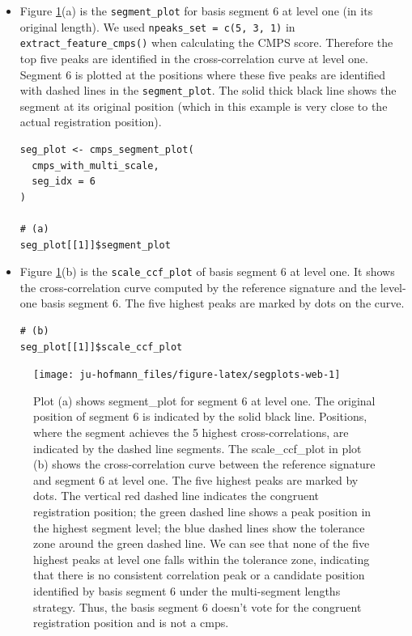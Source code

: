 \begin{itemize}
\item
  Figure \ref{fig:segplots-web}(a) is the \texttt{segment\_plot} for basis segment 6 at level one (in its original length). We used \texttt{npeaks\_set\ =\ c(5,\ 3,\ 1)} in \texttt{extract\_feature\_cmps()} when calculating the CMPS score. Therefore the top five peaks are identified in the cross-correlation curve at level one. Segment 6 is plotted at the positions where these five peaks are identified with dashed lines in the \texttt{segment\_plot}. The solid thick black line shows the segment at its original position (which in this example is very close to the actual registration position).

\begin{verbatim}
seg_plot <- cmps_segment_plot(
  cmps_with_multi_scale,
  seg_idx = 6
)

# (a)
seg_plot[[1]]$segment_plot
\end{verbatim}
\item
  Figure \ref{fig:segplots-web}(b) is the \texttt{scale\_ccf\_plot} of basis segment 6 at level one. It shows the cross-correlation curve computed by the reference signature and the level-one basis segment 6. The five highest peaks are marked by dots on the curve.

\begin{verbatim}
# (b)
seg_plot[[1]]$scale_ccf_plot
\end{verbatim}
\end{itemize}

\begin{figure}

{\centering \texttt{[image: ju-hofmann\_files/figure-latex/segplots-web-1]} 

}

\caption{Plot (a) shows segment\_plot for segment 6 at level one. The original position of segment 6 is indicated by the solid black line. Positions, where the segment achieves the 5 highest cross-correlations, are indicated by the dashed line segments. The scale\_ccf\_plot in plot (b) shows the cross-correlation curve between the reference signature and segment 6 at level one. The five highest peaks are marked by dots. The vertical red dashed line indicates the congruent registration position; the green dashed line shows a peak position in the highest segment level; the blue dashed lines show the tolerance zone around the green dashed line. We can see that none of the five highest peaks at level one falls within the tolerance zone, indicating that there is no consistent correlation peak or a candidate position identified by basis segment 6 under the multi-segment lengths strategy. Thus, the basis segment 6 doesn't vote for the congruent registration position and is not a cmps.}\label{fig:segplots-web}
\end{figure}


